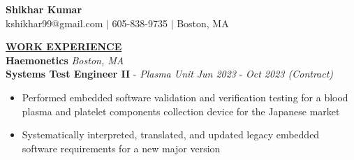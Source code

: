 \documentclass{article}
\begin{document}
\begin{center}
\thispagestyle{empty}
\huge \textbf{ Shikhar Kumar}\\
\normalsize kshikhar99@gmail.com $\mid$ 605-838-9735 $\mid$ Boston, MA    
\\
\hrulefill
\end{center}

\begin{comment}
\begin{center}
\thispagestyle{empty}
\large \textbf{ Shikhar Kumar}\\
\normalsize kshikhar99@gmail.com $\mid$ Boston, MA    
\\
\hrulefill
\end{center}
\end{comment}


\begin{comment}
\noindent \textbf{\underline{OBJECTIVE}} \\
\noindent  LOREM IPSUM \\
\end{comment}

\noindent \textbf{\large\underline{WORK EXPERIENCE}} \\
\noindent \textbf{Haemonetics} \hfill \textit{Boston, MA} \\ 
\textbf{Systems Test Engineer II} - \textit{Plasma Unit} \hfill \textit{Jun 2023} - \textit{Oct 2023 (Contract)}
\begin{itemize}[noitemsep,nolistsep]
\item {Performed embedded software validation and verification testing for a blood plasma and platelet components collection device for the Japanese market}
\item {Systematically interpreted, translated, and updated legacy embedded software requirements for a new major version}
\end{itemize}
\end{document}
